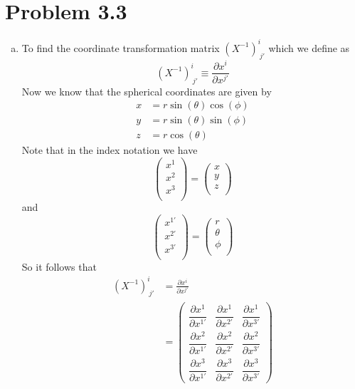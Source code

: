 \documentclass[11pt]{article}
\numberwithin{equation}{section}
\begin{document}
\section{Problem 3.3}
\begin{enumerate}[(a)]
\item
To find the coordinate transformation matrix $(X^{-1})^{i}_{\ j'}$ which we define as 
$$(X^{-1})^{i}_{\ j'}\equiv\frac{\partial x^i}{\partial x^{j'}}$$ 
Now we know that the spherical coordinates are given by
\begin{align*}
x &= r\sin(\theta)\cos(\phi)\\
y &= r\sin(\theta)\sin(\phi)\\
z &= r\cos(\theta)
\end{align*}
Note that in the index notation we have
$$\left(\begin{array}{c}
x^1\\ x^2\\ x^3\\
	\end{array}\right) = \left(\begin{array}{c}
				x\\ y\\ z\\
				\end{array}\right)$$ 
and
$$\left(\begin{array}{c}
x^{1'}\\ x^{2'}\\ x^{3'}\\
	\end{array}\right) = \left(\begin{array}{c}
				r\\ \theta\\ \phi\\
				\end{array}\right)$$ 
So it follows that
\begin{align*}
(X^{-1})^{i}_{\ j'} &= \frac{\partial x^i}{\partial x^{j'}}\\ 
&= \left(\begin{array}{ccc}
	\dfrac{\partial x^1}{\partial x^{1'}}	&\dfrac{\partial x^1}{\partial x^{2'}}	&\dfrac{\partial x^1}{\partial x^{3'}}\\
	\dfrac{\partial x^2}{\partial x^{1'}}	&\dfrac{\partial x^2}{\partial x^{2'}}	&\dfrac{\partial x^2}{\partial x^{3'}}\\
	\dfrac{\partial x^3}{\partial x^{1'}}	&\dfrac{\partial x^3}{\partial x^{2'}}	&\dfrac{\partial x^3}{\partial x^{3'}}
	\end{array}\right)\\

\end{align*}
\end{enumerate}
\end{document}
